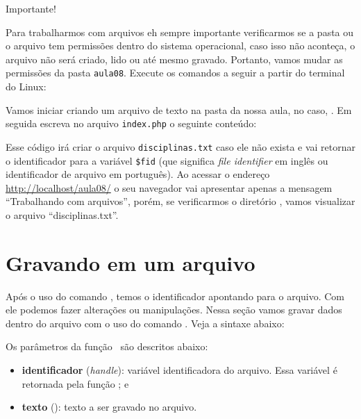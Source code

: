 \begin{framed}
{\Large Importante!}

Para trabalharmos com arquivos eh sempre importante verificarmos se a pasta ou o arquivo 
tem permissões dentro do sistema operacional, caso isso não aconteça, o arquivo não 
será criado, lido ou até mesmo gravado. Portanto, vamos mudar as permissões da pasta
\texttt{aula08}. Execute os comandos a seguir a partir do terminal do Linux:



\end{framed}

Vamos iniciar criando um arquivo de texto na pasta da nossa aula, no caso, 
. Em seguida escreva no arquivo \texttt{index.php} o 
seguinte conteúdo:



Esse código irá criar o arquivo \texttt{disciplinas.txt} caso ele não exista e
vai retornar o identificador para a variável \texttt{\$fid} (que significa 
\textit{file identifier} em inglês ou identificador de arquivo em português).
Ao acessar o endereço \url{http://localhost/aula08/} o seu navegador
vai apresentar apenas a mensagem ``Trabalhando com arquivos'', porém, se 
verificarmos o diretório , vamos visualizar o arquivo
``disciplinas.txt''.

\section{Gravando em um arquivo}
\label{gravando-em-um-arquivo}

Após o uso do comando \funcaofopen, temos o identificador apontando para o 
arquivo. Com ele podemos fazer alterações ou manipulações. Nessa seção vamos 
gravar dados dentro do arquivo com o uso do comando \funcaofwrite. Veja a sintaxe
abaixo:



Os parâmetros da função \funcaofwrite~são descritos abaixo:

\begin{itemize}
  \item \textbf{identificador} (\textit{handle}): variável identificadora do
  arquivo. Essa variável é retornada pela função \funcaofopen; e
  \item \textbf{texto} (\tipostring): texto a ser gravado no arquivo.
\end{itemize}

